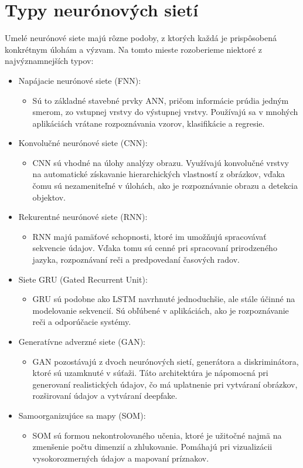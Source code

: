 \documentclass[10pt,twoside,slovak,a4paper]{article}
\begin{document}
\section{Typy neurónových sietí} \label{nejaka} \cite{shukla2020main}
Umelé neurónové siete majú rôzne podoby, z ktorých každá je prispôsobená konkrétnym úlohám a výzvam. Na tomto mieste rozoberieme niektoré z najvýznamnejších typov:
\begin{itemize}
\item Napájacie neurónové siete (FNN):
        \begin{itemize}
	\item Sú to základné stavebné prvky ANN, pričom informácie prúdia jedným smerom, zo vstupnej vrstvy do výstupnej vrstvy. Používajú sa v mnohých aplikáciách vrátane rozpoznávania vzorov, klasifikácie a regresie.
	\end{itemize}
\item Konvolučné neurónové siete (CNN):
	\begin{itemize}
	\item CNN sú vhodné na úlohy analýzy obrazu. Využívajú konvolučné vrstvy na automatické získavanie hierarchických vlastností z obrázkov, vďaka čomu sú nezameniteľné v úlohách, ako je rozpoznávanie obrazu a detekcia objektov.
	\end{itemize}
\item Rekurentné neurónové siete (RNN):
	\begin{itemize}
	\item  RNN majú pamäťové schopnosti, ktoré im umožňujú spracovávať sekvencie údajov. Vďaka tomu sú cenné pri spracovaní prirodzeného jazyka, rozpoznávaní reči a predpovedaní časových radov.
	\end{itemize}
\item Siete GRU (Gated Recurrent Unit):
	\begin{itemize}
	\item GRU sú podobne ako LSTM navrhnuté jednoduchšie, ale stále účinné na modelovanie sekvencií. Sú obľúbené v aplikáciách, ako je rozpoznávanie reči a odporúčacie systémy.
	\end{itemize}
\item Generatívne adverzné siete (GAN):
	\begin{itemize}
	\item GAN pozostávajú z dvoch neurónových sietí, generátora a diskriminátora, ktoré sú uzamknuté v súťaži. Táto architektúra je nápomocná pri generovaní realistických údajov, čo má uplatnenie pri vytváraní obrázkov, rozširovaní údajov a vytváraní deepfake.
	\end{itemize}
\item Samoorganizujúce sa mapy (SOM):
	\begin{itemize}
	\item SOM sú formou nekontrolovaného učenia, ktoré je užitočné najmä na zmenšenie počtu dimenzií a zhlukovanie. Pomáhajú pri vizualizácii vysokorozmerných údajov a mapovaní príznakov.
	\end{itemize}
\end{itemize}
 
\end{document}
